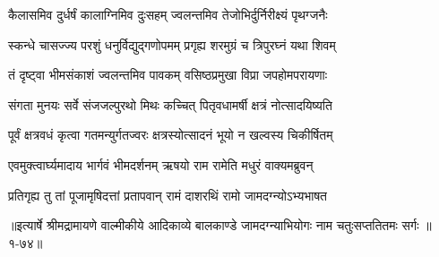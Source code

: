 \twolineshloka
{कैलासमिव दुर्धर्षं कालाग्निमिव दुःसहम्}
{ज्वलन्तमिव तेजोभिर्दुर्निरीक्ष्यं पृथग्जनैः} %

\twolineshloka
{स्कन्धे चासज्ज्य परशुं धनुर्विद्युद्गणोपमम्}
{प्रगृह्य शरमुग्रं च त्रिपुरघ्नं यथा शिवम्} %

\twolineshloka
{तं दृष्ट्वा भीमसंकाशं ज्वलन्तमिव पावकम्}
{वसिष्ठप्रमुखा विप्रा जपहोमपरायणाः} %

\twolineshloka
{संगता मुनयः सर्वे संजजल्पुरथो मिथः}
{कच्चित् पितृवधामर्षी क्षत्रं नोत्सादयिष्यति} %

\twolineshloka
{पूर्वं क्षत्रवधं कृत्वा गतमन्युर्गतज्वरः}
{क्षत्रस्योत्सादनं भूयो न खल्वस्य चिकीर्षितम्} %

\twolineshloka
{एवमुक्त्वार्घ्यमादाय भार्गवं भीमदर्शनम्}
{ऋषयो राम रामेति मधुरं वाक्यमब्रुवन्} %

\twolineshloka
{प्रतिगृह्य तु तां पूजामृषिदत्तां प्रतापवान्}
{रामं दाशरथिं रामो जामदग्न्योऽभ्यभाषत} %


॥इत्यार्षे श्रीमद्रामायणे वाल्मीकीये आदिकाव्ये बालकाण्डे जामदग्न्याभियोगः नाम चतुःसप्ततितमः सर्गः ॥१-७४॥

